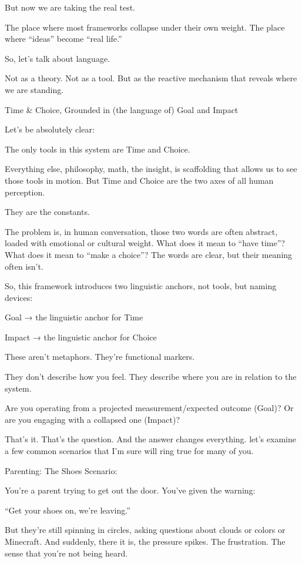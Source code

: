 \documentclass[11pt]{article}
\begin{document}
But now we are taking the real test.

The place where most frameworks collapse under their own weight.
The place where “ideas” become “real life.”

So, let’s talk about language.

Not as a theory.
Not as a tool.
But as the reactive mechanism that reveals where we are standing.

Time & Choice, Grounded in (the language of) Goal and Impact

Let’s be absolutely clear:

The only tools in this system are Time and Choice.

Everything else, philosophy, math, the insight, is scaffolding that allows us to see those tools in motion. But Time and Choice are the two axes of all human perception.

They are the constants.

The problem is, in human conversation, those two words are often abstract, loaded with emotional or cultural weight. What does it mean to “have time”? What does it mean to “make a choice”? The words are clear, but their meaning often isn’t.

So, this framework introduces two linguistic anchors, not tools, but naming devices:

Goal → the linguistic anchor for Time

Impact → the linguistic anchor for Choice

These aren’t metaphors. They’re functional markers.

They don’t describe how you feel.
They describe where you are in relation to the system.

Are you operating from a projected measurement/expected outcome (Goal)? 
Or are you engaging with a collapsed one (Impact)?

That’s it. That’s the question.
And the answer changes everything.
let’s examine a few common scenarios that I’m sure will ring true for many of you. 

Parenting: The Shoes Scenario:

You’re a parent trying to get out the door. You’ve given the warning:

“Get your shoes on, we’re leaving.”

But they’re still spinning in circles, asking questions about clouds or colors or Minecraft. And suddenly, there it is, the pressure spikes. The frustration. The sense that you’re not being heard.
\end{document}
